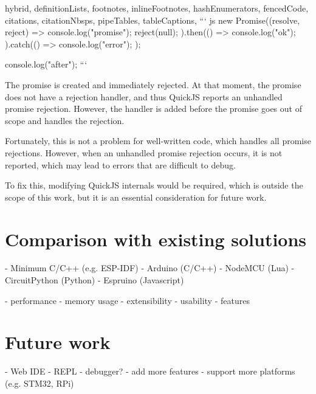 \documentclass[
  digital,
  oneside,
  nosansbold,
  nocolorbold,
  lof,
  lot
]{fithesis4}
\begin{document}
\begin{markdown*}{%
  hybrid,
  definitionLists,
  footnotes,
  inlineFootnotes,
  hashEnumerators,
  fencedCode,
  citations,
  citationNbsps,
  pipeTables,
  tableCaptions,
}
``` js
new Promise((resolve, reject) => {
    console.log("promise");
    reject(null);
}).then(() => {
    console.log("ok");
}).catch(() => {
    console.log("error");
});

console.log("after");
```

The promise is created and immediately rejected. At that moment, the promise does not have a rejection handler, and thus QuickJS reports an unhandled promise rejection. However, the handler is added before the promise goes out of scope and handles the rejection.

Fortunately, this is not a problem for well-written code, which handles all promise rejections. However, when an unhandled promise rejection occurs, it is not reported, which may lead to errors that are difficult to debug.

To fix this, modifying QuickJS internals would be required, which is outside the scope of this work, but it is an essential consideration for future work.





\chapter{Comparison with existing solutions}

  - Minimum C/C++ (e.g. ESP-IDF)
  - Arduino (C/C++)
  - NodeMCU (Lua)
  - CircuitPython (Python)
  - Espruino (Javascript)

  - performance
  - memory usage
  - extensibility
  - usability
  - features


\chapter{Future work}

  - Web IDE
  - REPL
  - debugger?
  - add more features
  - support more platforms (e.g. STM32, RPi)

\end{markdown*}
\end{document}
